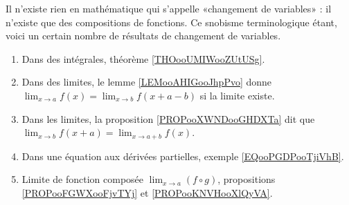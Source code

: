 	\label{THEMEooChangementVariables}
Il n'existe rien en mathématique qui s'appelle «changement de variables» : il n'existe que des compositions de fonctions. Ce snobisme terminologique étant, voici un certain nombre de résultats de changement de variables.
\begin{enumerate}
	\item
	      Dans des intégrales, théorème \ref{THOooUMIWooZUtUSg}.
	\item
	      Dans des limites, le lemme \ref{LEMooAHIGooJhpPvo} donne \( \lim_{x\to a} f(x)=\lim_{x\to b}f(x+a-b)\) si la limite existe.
	\item
	      Dans les limites, la proposition \ref{PROPooXWNDooGHDXTa} dit que \( \lim_{x\to b}f(x+a)=\lim_{x\to a+b}f(x)\).
	\item
	      Dans une équation aux dérivées partielles, exemple \ref{EQooPGDPooTjiVhB}.
	\item
	      Limite de fonction composée \( \lim_{x\to a}(f\circ g) \), propositions \ref{PROPooFGWXooFjvTYj} et \ref{PROPooKNVHooXlQyVA}.
\end{enumerate}
